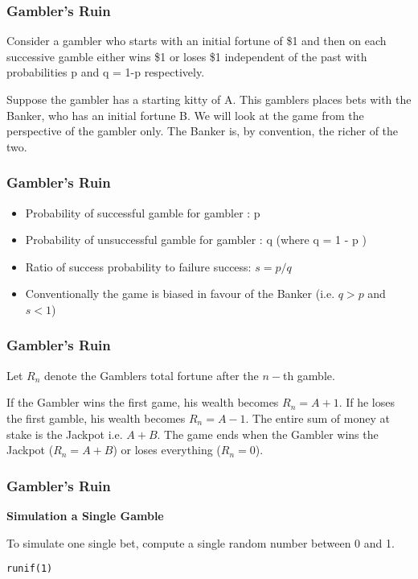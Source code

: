 \begin{frame}
\frametitle{Gambler's Ruin}

Consider a gambler who starts with an initial fortune of \$1 and then on each successive gamble
either wins \$1 or loses \$1 independent of the past with probabilities p and q = 1-p respectively.

Suppose the gambler has a starting kitty of A.
This gamblers places bets with the Banker, who has an initial fortune B. We will look at the game from the perspective of the gambler only.
The Banker is, by convention, the richer of the two.
\end{frame}
\begin{frame}
\frametitle{Gambler's Ruin}
\begin{itemize}
\item Probability of successful gamble for gambler : p
\item Probability of unsuccessful gamble for gambler : q 	(where q =  1 - p )
\item Ratio of success probability to failure success:	$s = p / q$
\item Conventionally the game is biased in favour of the Banker (i.e. $q>p$ and $s<1$)
\end{itemize}
\end{frame}
\begin{frame}
\frametitle{Gambler's Ruin}
Let $R_n$ denote the Gamblers total fortune after the $n-$th gamble.

If the Gambler wins the first game, his wealth becomes $R_n =A+1$.
If he loses the first gamble, his wealth becomes $R_n = A-1$.
The entire sum of money at stake is the Jackpot i.e.   $A+B$.
The game ends when the Gambler wins the Jackpot ($R_n = A+B$) or loses everything ($R_n = 0$).

\end{frame}
\begin{frame}
	\frametitle{Gambler's Ruin}
\textbf{Simulation a Single Gamble}


To simulate one single bet, compute a single random number between 0 and 1.
\begin{framed}
\begin{verbatim}
runif(1)
\end{verbatim}
\end{framed}

\end{frame}
